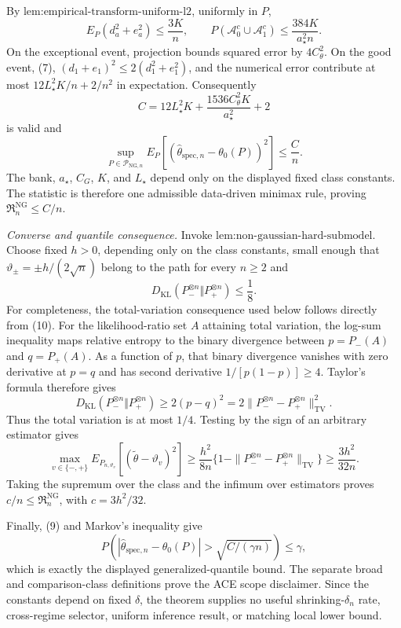 By \(\text{lem:empirical-transform-uniform-l2}\), uniformly in \(P\),
\[
 E_P(d_a^2+e_a^2)\le\frac{3K}{n},
 \qquad
 P(\mathcal A_0^c\cup\mathcal A_1^c)
 \le\frac{384K}{a_{\star}^2n}. \tag{8}
\]
On the exceptional event, projection bounds squared error by \(4C_{\theta}^2\).  On the good event, (7), \((d_1+e_1)^2\le2(d_1^2+e_1^2)\), and the numerical error contribute at most \(12L_{\star}^2K/n+2/n^2\) in expectation.  Consequently
\[
 C=12L_{\star}^2K+\frac{1536C_{\theta}^2K}{a_{\star}^2}+2
\]
is valid and
\[
 \sup_{P\in\mathcal P_{\mathrm{NG},n}}
 E_P[(\widehat\theta_{\mathrm{spec},n}-\theta_0(P))^2]
 \le\frac Cn. \tag{9}
\]
The bank, \(a_{\star}\), \(C_G\), \(K\), and \(L_{\star}\) depend only on the displayed fixed class constants.  The statistic is therefore one admissible data-driven minimax rule, proving \(\mathfrak R_n^{\mathrm{NG}}\le C/n\).

\emph{Converse and quantile consequence.}  Invoke \(\text{lem:non-gaussian-hard-submodel}\).  Choose fixed \(h>0\), depending only on the class constants, small enough that \(\vartheta_{\pm}=\pm h/(2\sqrt n)\) belong to the path for every \(n\ge2\) and
\[
 D_{\mathrm{KL}}(P_-^{\otimes n}\Vert P_+^{\otimes n})\le\frac18. \tag{10}
\]
For completeness, the total-variation consequence used below follows directly from (10).  For the likelihood-ratio set \(A\) attaining total variation, the log-sum inequality maps relative entropy to the binary divergence between \(p=P_-(A)\) and \(q=P_+(A)\).  As a function of \(p\), that binary divergence vanishes with zero derivative at \(p=q\) and has second derivative \(1/[p(1-p)]\ge4\).  Taylor's formula therefore gives
\[
 D_{\mathrm{KL}}(P_-^{\otimes n}\Vert P_+^{\otimes n})
 \ge2(p-q)^2
 =2\|P_-^{\otimes n}-P_+^{\otimes n}\|_{\mathrm{TV}}^2.
\]
Thus the total variation is at most \(1/4\).  Testing by the sign of an arbitrary estimator gives
\[
 \max_{v\in\{-,+\}}E_{P_{n,\vartheta_v}}
 [ (\widetilde\theta-\vartheta_v)^2]
 \ge\frac{h^2}{8n}
 \{1-\|P_-^{\otimes n}-P_+^{\otimes n}\|_{\mathrm{TV}}\}
 \ge\frac{3h^2}{32n}.
\]
Taking the supremum over the class and the infimum over estimators proves \(c/n\le\mathfrak R_n^{\mathrm{NG}}\), with \(c=3h^2/32\).

Finally, (9) and Markov's inequality give
\[
 P\!\left(|\widehat\theta_{\mathrm{spec},n}-\theta_0(P)|>
 \sqrt{C/(\gamma n)}\right)\le\gamma,
\]
which is exactly the displayed generalized-quantile bound.  The separate broad and comparison-class definitions prove the ACE scope disclaimer.  Since the constants depend on fixed \(\delta\), the theorem supplies no useful shrinking-\(\delta_n\) rate, cross-regime selector, uniform inference result, or matching local lower bound.